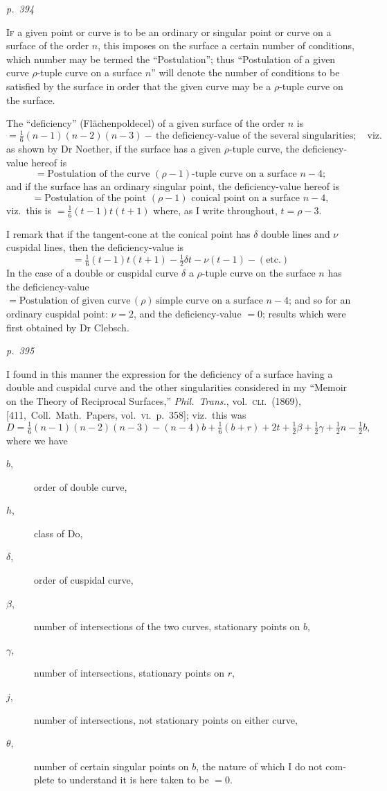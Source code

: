 \documentclass[11pt,a4paper]{article}
\theoremstyle{plain}
\theoremstyle{definition}
\begin{document}
\textit{p.~394}

\noindent
\textsc{If} a given point or curve is to be an ordinary or singular point or curve on a
surface of the order $n$, this imposes on the surface a certain number of conditions,
which number may be termed the ``Postulation''; thus ``Postulation of a given curve
$\rho$-tuple curve on a surface $n$'' will denote the number of conditions to be satisfied
by the surface in order that the given curve may be a $\rho$-tuple curve on the surface.

The ``deficiency'' (Fl\"achenpoldecel) of a given surface of the order $n$ is
\[
= \tfrac{1}{6}(n - 1)(n - 2)(n - 3) -\,\text{the deficiency-value of the several singularities}; \quad \text{viz.}
\]
as shown by Dr Noether, if the surface has a given $\rho$-tuple curve, the deficiency-value hereof is
\[
=\text{Postulation of the curve } (\rho - 1)\text{-tuple curve on a surface } n - 4;
\]
and if the surface has an ordinary singular point, the deficiency-value hereof is
\[
=\text{Postulation of the point } (\rho - 1)\text{ conical point on a surface } n - 4,
\]
viz.\ this is $= \tfrac{1}{6}(t - 1)t(t + 1)$ where, as I write throughout, $t = \rho - 3$.

I remark that if the tangent-cone at the conical point has $\delta$ double lines and
$\nu$ cuspidal lines, then the deficiency-value is
\[
= \tfrac{1}{6}(t - 1) t (t + 1) - \tfrac{1}{2}\delta t - \nu(t - 1) - (\text{etc.})
\]
In the case of a double or cuspidal curve $\delta$ a $\rho$-tuple curve on the surface $n$ has the deficiency-value
$= \text{Postulation of given curve}\,(\rho)\,\text{simple curve on a surface } n - 4$;
and so for an ordinary cuspidal point: $\nu = 2$, and the deficiency-value $= 0$; results
which were first obtained by Dr Clebsch.

\clearpage

\bigskip
\textit{p.~395}
\smallskip

\noindent
I found in this manner the expression for the deficiency of a surface having
a double and cuspidal curve and the other singularities considered in my ``Memoir on
the Theory of Reciprocal Surfaces,'' \textit{Phil.\ Trans.}, vol.\ \textsc{cli.\ (1869)}, [411,\ Coll.\ Math.\
Papers, vol.\ \textsc{vi}.\ p.\ 358]; viz.\ this was
\[
D = \tfrac{1}{6}(n - 1)(n - 2)(n - 3) - (n - 4)b + \tfrac{1}{6}(b + r) + 2t + \tfrac{1}{2}\beta + \tfrac{1}{2}\gamma + \tfrac{1}{2}n - \tfrac{1}{2}b,
\]
where we have
\begin{description}
\item[$b$,] order of double curve,
\item[$h$,] class of Do,
\item[$\delta$,] order of cuspidal curve,
\item[$\beta$,] number of intersections of the two curves, stationary points on $b$,
\item[$\gamma$,] number of intersections, stationary points on $r$,
\item[$j$,] number of intersections, not stationary points on either curve,
\item[$\theta$,] number of certain singular points on $b$, the nature of which I do not com-
plete to understand it is here taken to be $= 0$.
\end{description}
\end{document}
